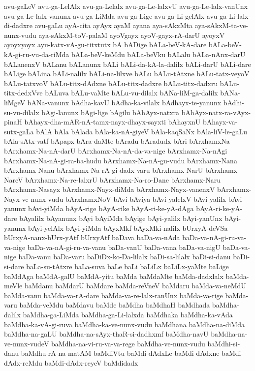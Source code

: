 {avu-gaLeV
avu-ga-LelAlx
avu-ga-Lelalx
avu-ga-Le-lalxvU
avu-ga-Le-lalx-vanUnx
avu-ga-Le-lalx-vanunx
avu-ga-LiMda
avu-ga-Lige
avu-ga-Li-gelAlx
avu-ga-Li-lalx-di-dadxre
avu-gaLu
ayA-cita
ayAyx
ayaM
ayana
aya-sAkxMta
aya-sAkxM-ta-ve-nunx-vudu
aya-sAkxM-toV-palaM
ayoVgayx
ayoV-gayx-rA-darU
ayoyxV
ayoyxyoyx
ayu-katx-vA-gu-titxtutx
bA
bADige
bALa-beV-kA-dare
bALa-beV-kA-gi-ru-vu-da-riMda
bALa-beV-keMdu
bALa-beVku
bALalu
bALa-nAnx-darU
bALanenxV
bALanu
bALanunx
bALi
bALi-da-kA-la-dalilx
bALi-darU
bALi-dare
bALige
bALina
bALi-nalilx
bALi-na-lilxve
bALu
bALu-tAtxne
bALu-tatx-veyoV
bALu-tatxvoV
bALu-titx-dAdxne
bALu-titx-dadxre
bALu-titx-dadxru
bALu-titx-dedxVve
bALuva
bALu-vaMte
bALu-vu-dilalx
bANa-liM-ga-dalilx
bANa-liMgeV
bANa-vanunx
bAdha-kavU
bAdha-ka-vilalx
bAdhayx-te-yanunx
bAdhi-su-vu-dilalx
bAgi-lanunx
bAgi-lige
bAgilu
bAhAyx-natxra
bAhAyx-natx-ra-vAyx-pinaH
bAhayx-dha-mAR-nA-tamx-nayx-dhayx-sayxti
bAhayxnU
bAhayx-va-sutx-gaLa
bAlA
bAla
bAlada
bAla-ka-nA-giyeV
bAla-kaqSaNx
bAla-liV-le-gaLu
bAla-sAtx-vatf
bApapx
bAra-daMte
bAradu
bAradudx
bAri
bArxhamxNa
bArxhamx-Na-nA-darU
bArxhamx-Na-nA-da-va-nige
bArxhamx-Na-nAgi
bArxhamx-Na-nA-gi-ra-ba-hudu
bArxhamx-Na-nA-gu-vudu
bArxhamx-Nana
bArxhamx-Nanu
bArxhamx-Na-rA-gi-dadx-varu
bArxhamx-NarU
bArxhamx-NareV
bArxhamx-Na-re-lalxrU
bArxhamx-Na-ro-Dane
bArxhamx-Naru
bArxhamx-Nasayx
bArxhamx-Nayx-diMda
bArxhamx-Nayx-vanenxV
bArxhamx-Nayx-ve-nunx-vudu
bArxhamxNoV
bAvi
bAviya
bAvi-yalelxV
bAvi-yalilx
bAvi-yanunx
bAvi-yiMda
bAyA-rige
bAyA-rike
bAyA-ri-ke-yA-dAga
bAyA-ri-ke-yA-dare
bAyalilx
bAyanunx
bAyi
bAyiMda
bAyige
bAyi-yalilx
bAyi-yanUnx
bAyi-yanunx
bAyi-yelAlx
bAyi-yiMda
bAyxMkf
bAyxMki-nalilx
bUrxyA-deVSa
bUrxyA-nanx-bUrx-yAtf
bUrxyAtf
baDava
baDa-va-nAda
baDa-va-nA-gi-ru-va-va-nige
baDa-va-nA-gi-ru-va-vanu
baDa-vanU
baDa-vana
baDa-va-nigU
baDa-va-nige
baDa-vanu
baDa-varu
baDiDx-ko-Da-lilalx
baDi-sa-lilalx
baDi-si-danu
baDi-si-dare
baLa-su-tAtxre
baLa-suva
baLe
baLi
baLiLx
baLiLx-yaMte
baLige
baMdAga
baMdA-galU
baMdA-yitu
baMda
baMdaMte
baMda-dadxlalx
baMda-meVle
baMdanu
baMdarU
baMdare
baMda-reVneV
baMdaru
baMda-va-neMdU
baMda-vanu
baMda-va-rA-dare
baMda-va-re-lalx-ranUnx
baMda-va-rige
baMda-varu
baMda-veMdu
baMdavu
baMde
baMdha
baMdhaH
baMdhada
baMdha-dalilx
baMdha-ga-LiMda
baMdha-ga-Li-lalxda
baMdhaka
baMdha-ka-vAda
baMdha-ka-vA-gi-ruva
baMdha-ka-ve-nunx-vudu
baMdhana
baMdha-na-diMda
baMdha-na-gaLU
baMdha-na-sAyx-thaR-si-dadhxmf
baMdha-navU
baMdha-na-ve-nunx-vudeV
baMdha-na-vi-ru-va-va-rege
baMdha-ve-nunx-vudu
baMdhi-si-danu
baMdhu-rA-na-matAM
baMdiVtu
baMdi-dAdxLe
baMdi-dAdxne
baMdi-dAdx-reMdu
baMdi-dAdx-reyeV
baMdidadx
}

